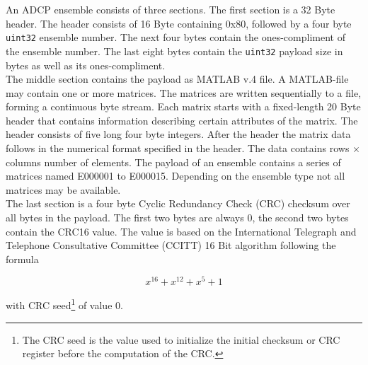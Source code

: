 An ADCP ensemble consists of three sections. The first section is a 32 Byte header. The header consists of 16 Byte containing 0x80, followed by a four byte \texttt{uint32} ensemble number. The next four bytes contain the ones-compliment of the ensemble number. The last eight bytes contain the \texttt{uint32} payload size in bytes as well as its ones-compliment.\\
The middle section contains the payload as MATLAB v.4 \cite{matlab} file. A MATLAB-file may contain one or more matrices. The matrices are written sequentially to a file, forming a continuous byte stream. Each matrix starts with a fixed-length 20 Byte header that contains information describing certain attributes of the matrix. The header consists of five long four byte integers. After the header the matrix data follows in the numerical format specified in the header. The data contains rows $\times$ columns number of elements.
The payload of an ensemble contains a series of matrices named E000001 to E000015. Depending on the ensemble type not all matrices may be available.\\
The last section is a four byte Cyclic Redundancy Check (CRC) checksum over all bytes in the payload. The first two bytes are always 0, the second two bytes contain the CRC16 value. The value is based on the International Telegraph and Telephone Consultative Committee (CCITT) 16 Bit algorithm following the formula 

$$ x^{16} + x^{12} + x^5 +1$$

with CRC seed\footnote{\label{foot:3} The CRC seed is the value used to initialize the initial checksum or CRC register before the computation of the CRC.} of value 0.

